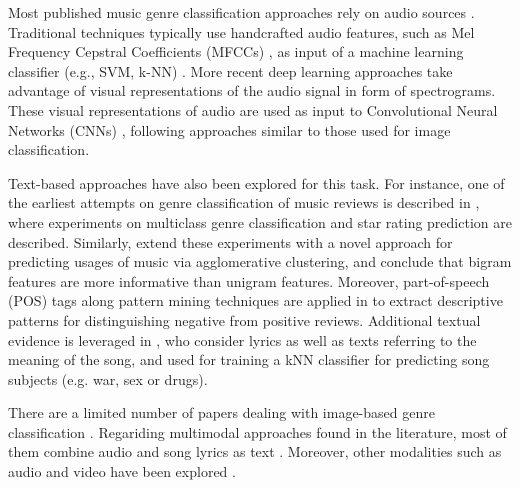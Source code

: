 Most published music genre classification approaches rely on audio sources \citep{sturm2012survey,bogdanov2016cross}. 
Traditional techniques typically use handcrafted audio features, such as Mel Frequency Cepstral Coefficients (MFCCs) \citep{logan2000mel}, as input of a machine learning classifier (e.g., SVM, k-NN) \citep{Tzanetakis2002,seyerlehner2010using}.
More recent deep learning approaches take advantage of visual representations of the audio signal in form of spectrograms.
These visual representations of audio are used as input to Convolutional Neural Networks (CNNs) \citep{dieleman2011audio,dieleman2014end,pons2016experimenting,Choi2016,choi2016convolutional}, following approaches similar to those used for image classification.

Text-based approaches have also been explored for this task. For instance, one of the earliest attempts on genre classification of music reviews is described in \citep{Hu2005}, where experiments on multiclass genre classification and star rating prediction are described. Similarly, \citep{Hu2006} extend these experiments with a novel approach for predicting usages of music via agglomerative clustering, and conclude that bigram features are more informative than unigram features. 
Moreover, part-of-speech (POS) tags along pattern mining techniques are applied in \citep{Downie2006} to extract descriptive patterns for distinguishing negative from positive reviews. Additional textual evidence is leveraged in \citep{Choi2014}, who consider lyrics as well as texts referring to the meaning of the song, and used for training a kNN classifier for predicting song subjects (e.g. war, sex or drugs).

There are a limited number of papers dealing with image-based genre classification \citep{libeks2011you}.
Regariding multimodal approaches found in the literature, most of them combine audio and song lyrics as text \citep{laurier2008multimodal,neumayer2007integration}. Moreover, other modalities such as audio and video have been explored \citep{schindler2015audio}. 

